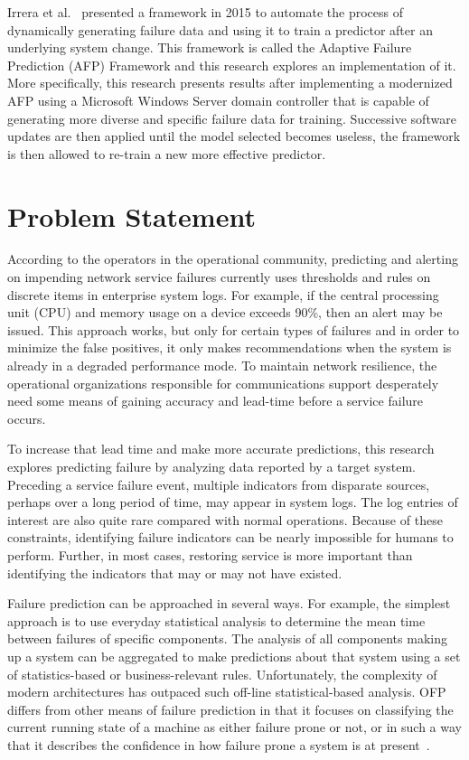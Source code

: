 Irrera et al.~\cite{irrera2015} presented a framework in 2015 to automate the
process of dynamically generating failure data and using it to train a
predictor after an underlying system change.  This framework is called the
Adaptive Failure Prediction (AFP) Framework and this research explores an
implementation of it.  More specifically, this research presents results after
implementing a modernized AFP using a Microsoft Windows Server domain
controller that is capable of generating more diverse and specific failure data
for training.  Successive software updates are then applied until the model
selected becomes useless, the framework is then allowed to re-train a new
more effective predictor.

\section{Problem Statement}
According to the operators in the operational community, predicting and
alerting on impending network service failures currently uses thresholds and
rules on discrete items in enterprise system logs.  For example, if the central
processing unit (CPU) and memory usage on a device exceeds 90\%, then an alert
may be issued.  This approach works, but only for certain types of failures and
in order to minimize the false positives, it only makes recommendations when
the system is already in a degraded performance mode.  To maintain network
resilience, the operational organizations responsible for communications
support desperately need some means of gaining accuracy and lead-time before a
service failure occurs.  

To increase that lead time and make more accurate predictions, this research
explores predicting failure by analyzing data reported by a target system.
Preceding a service failure event, multiple indicators from disparate sources,
perhaps over a long period of time, may appear in system logs.  The log entries
of interest are also quite rare compared with normal operations.  Because of
these constraints, identifying failure indicators can be nearly impossible for
humans to perform.  Further, in most cases, restoring service is more important
than identifying the indicators that may or may not have existed.  

Failure prediction can be approached in several ways. For example, the simplest
approach is to use everyday statistical analysis to determine the mean time
between failures of specific components. The analysis of all components making
up a system can be aggregated to make predictions about that system using a set
of statistics-based or business-relevant rules.  Unfortunately, the complexity
of modern architectures has outpaced such off-line statistical-based analysis.
OFP differs from other means of failure prediction in that it focuses on
classifying the current running state of a machine as either failure prone or
not, or in such a way that it describes the confidence in how failure prone a
system is at present~\cite{salfnerSurvey}.

